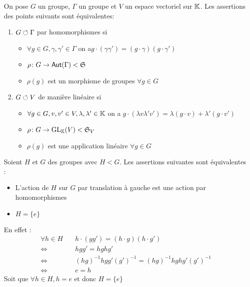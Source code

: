 \documentclass[french,a4paper,10pt]{article}
\begin{document}
	\begin{definition}
		On pose $G$ un groupe, $\Gamma$ un groupe et $V$ un espace vectoriel sur $\mathbb{K}$. Les assertions des points suivants sont équivalentes:
			\begin{enumerate}[label=$(\roman*)$]
				\item $G\circlearrowleft \Gamma$ par homomorphismes si 
					\begin{itemize}
						\item $\forall g\in G,\gamma,\gamma'\in\Gamma$ on a$ g\cdot(\gamma\gamma')=(g\cdot \gamma)(g\cdot \gamma')$
						\item $\rho\colon G\to\operatorname{\mathsf{Aut}}(\Gamma)<\mathfrak S$
						\item $\rho(g)$ est un morphisme de groupes $\forall g\in G$
					\end{itemize}
				
				\item $G\circlearrowleft V$ de manière linéaire si 
					\begin{itemize}
						\item $\forall g\in G,v,v'\in V,\lambda,\lambda'\in\mathbb{K}$ on a $g\cdot(\lambda v\lambda'v')=\lambda(g\cdot v)+\lambda'(g\cdot v')$
						\item $\rho\colon G\to \text{GL}_{\mathbb{K}}(V)<\mathfrak{S}_V$
						\item $\rho(g)$ est une application linéaire $\forall g\in G$
					\end{itemize}
			\end{enumerate}
	\end{definition}
	\begin{myexample}
		Soient $H$ et $G$ des groupes avec $H<G$. Les assertions suivantes sont équivalentes :
		\begin{itemize}
			\item L'action de $H$ sur $G$ par translation à gauche est une action par homomorphismes
			\item $H=\{e\}$
		\end{itemize}
		En effet :
			\[\begin{aligned}
				\forall h\in H\quad
				&h\cdot(gg')=(h\cdot g)(h\cdot g')\\
				\Longleftrightarrow &hgg'=hghg'\\
				\Longleftrightarrow& (hg)^{-1}hgg'(g')^{-1}=(hg)^{-1}hghg'(g')^{-1}\\
				\Longleftrightarrow&e=h
			\end{aligned}\]
		Soit que $\forall h\in H,h=e$ et donc $H=\{e\}$
	\end{myexample}
\end{document}
